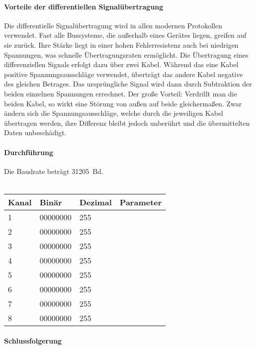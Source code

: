 \paragraph{Vorteile der differentiellen Signalübertragung}
Die differentielle Signalübertragung wird in allen modernen Protokollen verwendet. Fast alle Bussysteme, die außerhalb eines Gerätes liegen, greifen auf sie zurück. Ihre Stärke liegt in einer hohen Fehlerresistenz auch bei niedrigen Spannungen, was schnelle Übertragungsraten ermöglicht. Die Übertragung eines differenziellen Signals erfolgt dazu über zwei Kabel. Während das eine Kabel positive Spannungsausschläge verwendet, überträgt das andere Kabel negative des gleichen Betrages. Das ursprüngliche Signal wird dann durch Subtraktion der beiden einzelnen Spannungen errechnet. Der große Vorteil: Verdrillt man die beiden Kabel, so wirkt eine Störung von außen auf beide gleichermaßen. Zwar ändern sich die Spannungsausschläge, welche durch die jeweiligen Kabel übertragen werden, ihre Differenz bleibt jedoch unberührt und die übermittelten Daten unbeschädigt.

\paragraph{Durchführung}
Die Baudrate beträgt \SI{31205}{Bd}.
\\\\
\begin{tabular}{|l|l|l|l|}
	\hline
	Kanal & Binär    & Dezimal & Parameter \\ \hline\hline
	1     & 00000000 & 255     &           \\ \hline
	2     & 00000000 & 255     &           \\ \hline
	3     & 00000000 & 255     &           \\ \hline
	4     & 00000000 & 255     &           \\ \hline
	5     & 00000000 & 255     &           \\ \hline
	6     & 00000000 & 255     &           \\ \hline
	7     & 00000000 & 255     &           \\ \hline
	8     & 00000000 & 255     &           \\ \hline
\end{tabular}

\paragraph{Schlussfolgerung}


